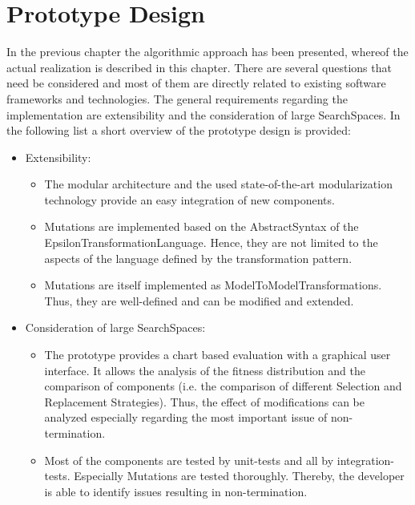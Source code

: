 \chapter{Prototype Design}\label{chapPrototypeDesign}



In the previous chapter the algorithmic approach has been presented, whereof the actual realization is described in this chapter. There are several questions that need be considered and most of them are directly related to existing software frameworks and technologies. The general requirements regarding the implementation are extensibility and the consideration of large \glspl{SearchSpace}. In the following list a short overview of the prototype design is provided:

\begin{itemize}
	\item Extensibility:
		\begin{itemize}
			\item The modular architecture and the used state-of-the-art modularization technology provide an easy integration of new components.
			\item \Glspl{Mutation} are implemented based on the \gls{AbstractSyntax} of the \gls{EpsilonTransformationLanguage}. Hence, they are not limited to the aspects of the language defined by the transformation pattern.
			\item \Glspl{Mutation} are itself implemented as \glspl{ModelToModelTransformation}. Thus, they are well-defined and can be modified and extended.
		\end{itemize}
	\item Consideration of large \glspl{SearchSpace}:
		\begin{itemize}
			\item The prototype provides a chart based evaluation with a graphical user interface. It allows the analysis of the fitness distribution and the comparison of components (i.e. the comparison of different Selection and Replacement Strategies). Thus, the effect of modifications can be analyzed especially regarding the most important issue of non-termination.
			\item Most of the components are tested by unit-tests and all by integration-tests. Especially \glspl{Mutation} are tested thoroughly. Thereby, the developer is able to identify issues resulting in non-termination.
		\end{itemize}
\end{itemize}

